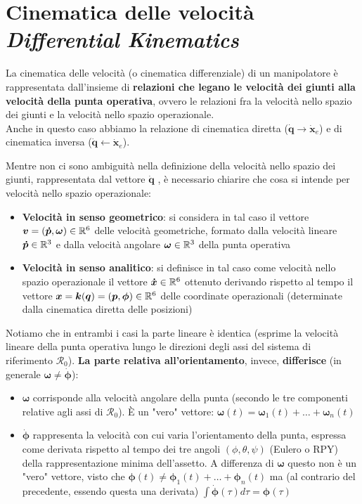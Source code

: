\chapter[Cinematica delle velocità]{Cinematica delle velocità \\ \large \textit{Differential Kinematics}}

La cinematica delle velocità (o cinematica differenziale) di un manipolatore è rappresentata dall’insieme di \textbf{relazioni che legano le velocità dei giunti alla velocità della punta operativa}, ovvero le relazioni fra la velocità nello spazio dei giunti e la velocità nello spazio operazionale.\\
Anche in questo caso abbiamo la relazione di cinematica diretta ($\dot{\boldsymbol{q}} \rightarrow \dot{\boldsymbol{x}}_e$) e di cinematica inversa ($\dot{\boldsymbol{q}} \leftarrow \dot{\boldsymbol{x}}_e$).

Mentre non ci sono ambiguità nella definizione della velocità nello spazio dei giunti, rappresentata dal vettore $\boldsymbol{\dot{q}}$ , è necessario chiarire che cosa si intende per velocità nello spazio operazionale:
\begin{itemize}
	\item \textbf{Velocità in senso geometrico}: si considera in tal caso il vettore $\boldsymbol{v} = (\boldsymbol{\dot{p}}, \boldsymbol{\omega}) \in \mathbb{R}^6$ delle velocità geometriche, formato dalla velocità lineare $\bm{\dot{p}} \in \mathbb{R}^3$ e dalla velocità angolare $\bm{\omega} \in \mathbb{R}^3$ della punta operativa
	\item \textbf{Velocità in senso analitico}: si definisce in tal caso come velocità nello spazio operazionale il vettore $\bm{\dot{x}}\in\mathbb{R}^6$ ottenuto derivando rispetto al tempo il vettore $\boldsymbol{x} = \bm{k}(\bm{q}) = (\boldsymbol{p}, \boldsymbol{\phi}) \in \mathbb{R}^6$ delle coordinate operazionali (determinate dalla cinematica diretta delle posizioni)
\end{itemize}


Notiamo che in entrambi i casi la parte lineare è identica (esprime la velocità lineare della punta operativa lungo le direzioni degli assi del sistema di riferimento $\mathcal{R}_0$). \textbf{La parte relativa all'orientamento}, invece, \textbf{differisce} (in generale $\bm{\omega} \neq \bm{\dot{\phi}}$):
\begin{itemize}
	\item $\bm{\omega}$ corrisponde alla velocità angolare della punta
	(secondo le tre componenti relative agli assi di $\mathcal{R}_0$). È un "vero" vettore: $\bm{\omega}(t) = \bm{\omega}_1(t) + \dots + \bm{\omega}_n(t)$
	\item $\bm{\dot{\phi}}$ rappresenta la velocità con cui varia l’orientamento della punta, espressa come derivata rispetto al tempo dei tre angoli $(\phi, \theta, \psi)$ (Eulero o RPY) della rappresentazione minima dell’assetto. A differenza di $\bm{\omega}$ questo non è un "vero" vettore, visto che $\bm{\phi}(t) \neq \bm{\phi}_1(t) + \dots + \bm{\phi}_n(t)$ ma (al contrario del precedente, essendo questa una derivata) $\int \bm{\dot{\phi}}(\tau) d\tau = \bm{\phi}(\tau)$
\end{itemize}
\ \\


